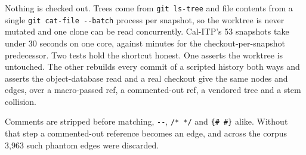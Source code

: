 \documentclass[10pt,conference]{IEEEtran}
\begin{document}
Nothing is checked out. Trees come from \texttt{git ls-tree} and file contents
from a single \texttt{git cat-file -{}-batch} process per snapshot, so the
worktree is never mutated and one clone can be read concurrently. Cal-ITP's 53
snapshots take under 30 seconds on one core, against minutes for the
checkout-per-snapshot predecessor. Two tests hold the shortcut honest. One
asserts the worktree is untouched. The other rebuilds every commit of a scripted
history both ways and asserts the object-database read and a real checkout give
the same nodes and edges, over a macro-passed ref, a commented-out ref, a
vendored tree and a stem collision.

Comments are stripped before matching, \texttt{-{}-}, \texttt{/* */} and
\texttt{\{\# \#\}} alike. Without that step a commented-out reference becomes an
edge, and across the corpus 3{,}963 such phantom edges were discarded.
\end{document}
